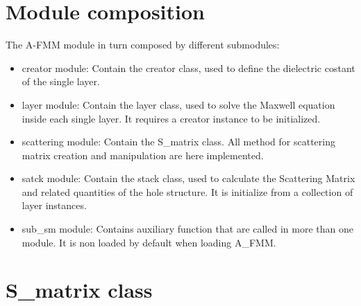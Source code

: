 \documentclass[a4paper,10pt]{report}
\begin{document}
\section{Module composition}
The A-FMM module in turn composed by different submodules:
\begin{itemize}
\item creator module: Contain the creator class, used to define the dielectric costant of the single layer.   
\item layer module: Contain the layer class, used to solve the Maxwell equation inside each single layer. It requires a creator instance to be initialized.
\item scattering module: Contain the S\_matrix class. All method for scattering matrix creation and manipulation are here implemented.  
\item satck module: Contain the stack class, used to calculate the Scattering Matrix and related quantities of the hole structure. It is initialize from a collection of layer instances.
\item sub\_sm module: Contains auxiliary function that are called in more than one module. It is non loaded by default when loading A\_FMM.
\end{itemize}

\section{S\_matrix class}
\end{document}
